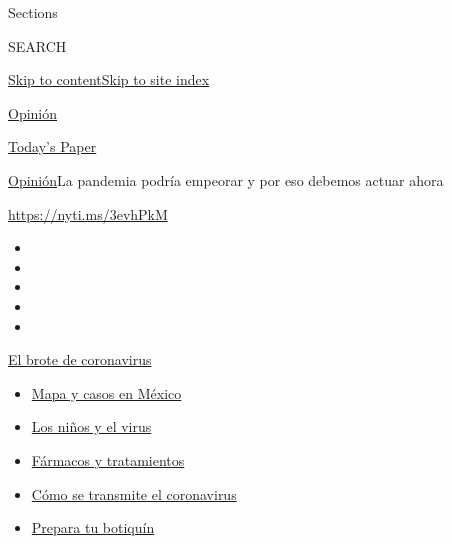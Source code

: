 Sections

SEARCH

\protect\hyperlink{site-content}{Skip to
content}\protect\hyperlink{site-index}{Skip to site index}

\href{https://www.nytimes.com/es/section/opinion}{Opinión}

\href{https://myaccount.nytimes.com/auth/login?response_type=cookie\&client_id=vi}{}

\href{https://www.nytimes.com/section/todayspaper}{Today's Paper}

\href{/es/section/opinion}{Opinión}\textbar{}La pandemia podría empeorar
y por eso debemos actuar ahora

\href{https://nyti.ms/3evhPkM}{https://nyti.ms/3evhPkM}

\begin{itemize}
\item
\item
\item
\item
\item
\end{itemize}

\href{https://www.nytimes.com/es/spotlight/coronavirus?action=click\&pgtype=Article\&state=default\&region=TOP_BANNER\&context=storylines_menu}{El
brote de coronavirus}

\begin{itemize}
\tightlist
\item
  \href{https://www.nytimes.com/es/interactive/2020/espanol/america-latina/coronavirus-en-mexico.html?action=click\&pgtype=Article\&state=default\&region=TOP_BANNER\&context=storylines_menu}{Mapa
  y casos en México}
\item
  \href{https://www.nytimes.com/es/2020/07/31/espanol/ciencia-y-tecnologia/ninos-contagio-coronavirus.html?action=click\&pgtype=Article\&state=default\&region=TOP_BANNER\&context=storylines_menu}{Los
  niños y el virus}
\item
  \href{https://www.nytimes.com/es/interactive/2020/science/coronavirus-tratamientos-curas.html?action=click\&pgtype=Article\&state=default\&region=TOP_BANNER\&context=storylines_menu}{Fármacos
  y tratamientos}
\item
  \href{https://www.nytimes.com/es/2020/07/06/espanol/ciencia-y-tecnologia/coronavirus-transmision-aire.html?action=click\&pgtype=Article\&state=default\&region=TOP_BANNER\&context=storylines_menu}{Cómo
  se transmite el coronavirus}
\item
  \href{https://www.nytimes.com/es/2020/07/14/espanol/estilos-de-vida/botiquin-medicina-coronavirus.html?action=click\&pgtype=Article\&state=default\&region=TOP_BANNER\&context=storylines_menu}{Prepara
  tu botiquín}
\end{itemize}

